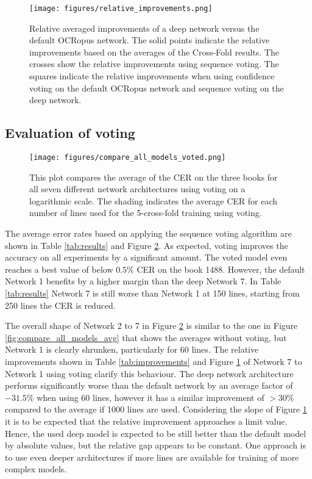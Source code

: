 \documentclass{jlcl}
\begin{document}
\begin{figure}[t]
    \centering
    \texttt{[image: figures/relative\_improvements.png]}
    \caption{Relative averaged improvements of a deep network versus the default OCRopus network. The solid points indicate the relative improvements based on the averages of the Cross-Fold results.
    The crosses show the relative improvements using sequence voting.
    The squares indicate the relative improvements when using confidence voting on the default OCRopus network and sequence voting on the deep network.}
    \label{fig:relative_improvements}
\end{figure}

\subsection{Evaluation of voting}
\label{sec:evaluation_of_voting}

\begin{figure}[t]
    \centering
    \texttt{[image: figures/compare\_all\_models\_voted.png]}
    \caption{This plot compares the average of the CER on the three books for all seven different network architectures using voting on a logarithmic scale. The shading indicates the average CER for each number of lines used for the 5-cross-fold training using voting.}
    \label{fig:compare_all_models_voted}
\end{figure}

The average error rates based on applying the sequence voting algorithm are shown in Table \ref{tab:results} and Figure \ref{fig:compare_all_models_voted}.
As expected, voting improves the accuracy on all experiments by a significant amount.
The voted model even reaches a best value of below $0.5\%$ CER on the book 1488.
However, the default Network 1 benefits by a higher margin than the deep Network 7.
In Table \ref{tab:results} Network 7 is still worse than Network 1 at 150 lines, starting from 250 lines the CER is reduced.

The overall shape of Network 2 to 7 in Figure \ref{fig:compare_all_models_voted} is similar to the one in Figure \ref{fig:compare_all_models_avg} that shows the averages without voting, but Network 1 is clearly shrunken, particularly for 60 lines.
The relative improvements shown in Table \ref{tab:improvements} and Figure \ref{fig:relative_improvements} of Network 7 to Network 1 using voting clarify this behaviour.
The deep network architecture performs significantly worse than the default network by an average factor of $-31.5\%$ when using 60 lines, however it has a similar improvement of $>30\%$ compared to the average if 1000 lines are used.
Considering the slope of Figure \ref{fig:relative_improvements} it is to be expected that the relative improvement approaches a limit value.
Hence, the used deep model is expected to be still better than the default model by absolute values, but the relative gap appears to be constant.
One approach is to use even deeper architectures if more lines are available for training of more complex models.
\end{document}
